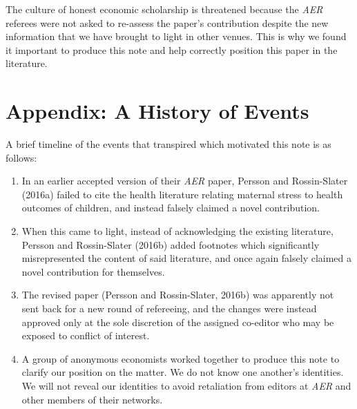 \documentclass[a4paper,12pt]{article}
\begin{document}
The culture of honest economic scholarship is threatened because the \emph{AER} referees were not asked to re-assess the paper's contribution despite the new information that we have brought to light in other venues. This is why we found it important to produce this note and help correctly position this paper in the literature.

\section*{Appendix: A History of Events} %
A brief timeline of the events that transpired which motivated this note is as follows:
\begin{enumerate}
  \item In an earlier accepted version of their \emph{AER} paper, Persson and Rossin-Slater (2016a) failed to cite the health literature relating maternal stress to health outcomes of children, and instead falsely claimed a novel contribution.
  \item When this came to light, instead of acknowledging the existing literature, Persson and Rossin-Slater (2016b) added footnotes which significantly misrepresented the content of said literature, and once again falsely claimed a novel contribution for themselves.
  \item The revised paper (Persson and Rossin-Slater, 2016b) was apparently not sent back for a new round of refereeing, and the changes were instead approved only at the sole discretion of the assigned co-editor who may be exposed to conflict of interest.
  \item A group of anonymous economists worked together to produce this note to clarify our position on the matter. We do not know one another's identities. We will not reveal our identities to avoid retaliation from editors at \emph{AER} and other members of their networks.
\end{enumerate}

\pagebreak
\end{document}

